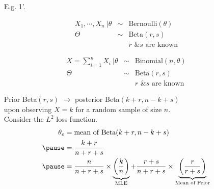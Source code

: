 \begin{frame}

\begin{enumerate}
\item[E.g. 1'.]
\begin{minipage}{0.45\textwidth}
\begin{eqnarray*}
 X_1,\cdots, X_n \:\big| \theta &\sim &\text{Bernoulli$(\theta)$}\\
 \Theta & \sim& \text{Beta$(r,s)$}\\
 && \text{$r$ \& $s$ are known}
\end{eqnarray*}
\end{minipage}
\hfill
\begin{minipage}{0.45\textwidth}
\begin{eqnarray*}
 X=\sum_{i=1}^nX_i \: \bigg| \theta&\sim& \text{Binomial$(n,\theta)$}\\
 \Theta & \sim& \text{Beta$(r,s)$}\\
 && \text{$r$ \& $s$ are known}
\end{eqnarray*}
\end{minipage} \pause\pause
\vfill
Prior Beta$(r,s)$ $\rightarrow$ posterior Beta$(k+r, n-k+s)$\\ \pause
upon observing $X=k$ for a random sample of size $n$.  \\[1em] \pause
Consider the $L^2$ loss function.
 \begin{align*}
 \theta_e & =\text{mean of Beta$(k+r,n-k+s)$} \\ \pause
 &= \frac{k+r}{n+r+s}\\ \pause
 &= \frac{n}{n+r+s}\times \underbrace{\mystrut{1em}\left(\frac{k}{n}\right)}_{\text{MLE}} + \frac{r+s}{n+r+s} \times \underbrace{\left(\frac{r}{r+s}\right)}_{\text{Mean of Prior}}
 \end{align*}
 \end{enumerate}
 \end{frame}
